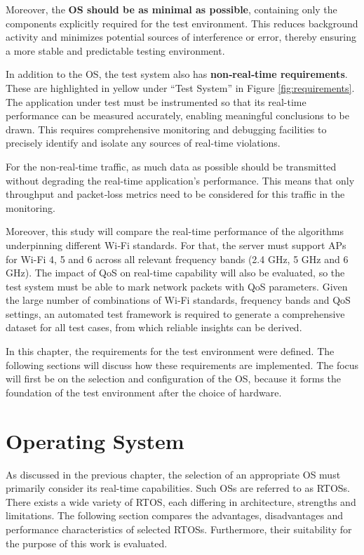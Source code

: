 Moreover, the \textbf{\ac{OS} should be as minimal as possible}, containing only the components explicitly required for the test environment. 
This reduces background activity and minimizes potential sources of interference or error, thereby ensuring a more stable and predictable testing environment.

In addition to the \ac{OS}, the test system also has \textbf{non‑real‑time requirements}.
These are highlighted in yellow under “Test System” in Figure \ref{fig:requirements}. 
The application under test must be instrumented so that its real-time performance can be measured accurately, enabling meaningful conclusions to be drawn. 
This requires comprehensive monitoring and debugging facilities to precisely identify and isolate any sources of real-time violations.

For the non‑real‑time traffic, as much data as possible should be transmitted without degrading the real-time application’s performance. 
This means that only throughput and packet‑loss metrics need to be considered for this traffic in the monitoring.

Moreover, this study will compare the real-time performance of the algorithms underpinning different Wi‑Fi standards. 
For that, the server must support \acp{AP}  for Wi-Fi 4, 5 and 6 across all relevant frequency bands (2.4 GHz, 5 GHz and 6 GHz). 
The impact of QoS on real-time capability will also be evaluated, so the test system must be able to mark network packets with QoS parameters. 
Given the large number of combinations of Wi‑Fi standards, frequency bands and QoS settings, an automated test framework is required to generate a comprehensive dataset for all test cases, from which reliable insights can be derived.

In this chapter, the requirements for the test environment were defined. 
The following sections will discuss how these requirements are implemented. 
The focus will first be on the selection and configuration of the \ac{OS}, because it forms the foundation of the test environment after the choice of hardware.

\section{Operating System} \label{sec:os}
As discussed in the previous chapter, the selection of an appropriate \ac{OS} must primarily consider its real-time capabilities. 
Such \acp{OS} are referred to as \acp{RTOS}. 
There exists a wide variety of \ac{RTOS}, each differing in architecture, strengths and limitations.
The following section compares the advantages, disadvantages and performance characteristics of selected \acp{RTOS}. 
Furthermore, their suitability for the purpose of this work is evaluated.

